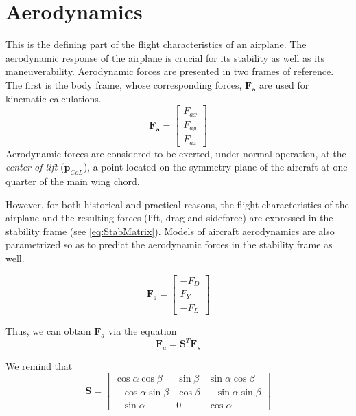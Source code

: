 \section{Aerodynamics}
This is the defining part of the flight characteristics of an airplane. The aerodynamic response of the airplane is crucial for its stability as well as its maneuverability.
Aerodynamic forces are presented in two frames of reference. The first is the body frame, whose corresponding forces, $\bm{F_a}$ are used for kinematic calculations. 
\begin{equation}
	\bm{F_a} = \begin{bmatrix}
	F_{ax} \\ F_{ay} \\ F_{az}
	\end{bmatrix}
\end{equation}
Aerodynamic forces are considered to be exerted, under normal operation, at the \emph{center of lift} ($\bm{p}_{CoL}$), a point located on the symmetry plane of the aircraft at one-quarter of the main wing chord.

However, for both historical and practical reasons, the flight characteristics of the airplane and the resulting forces (lift, drag and sideforce) are expressed in the stability frame (see \ref{eq:StabMatrix}). Models of aircraft aerodynamics are also parametrized so as to predict the aerodynamic forces in the stability frame as well.

\begin{equation}
	\bm{F_s} = \begin{bmatrix}
	-F_D \\ F_Y \\ -F_L
	\end{bmatrix}
\end{equation}

Thus, we can obtain $\bm{F}_a$ via the equation
\begin{equation}
	\bm{F}_a = \bm{S}^T \bm{F}_s
\end{equation}

We remind that
\begin{equation*}
	\bm{S} =
	\begin{bmatrix}
		\cos \alpha \cos \beta  & \sin \beta & \sin \alpha \cos \beta  \\
		-\cos \alpha \sin \beta & \cos \beta & -\sin \alpha \sin \beta \\
		-\sin \alpha            & 0          & \cos \alpha
	\end{bmatrix}
\end{equation*}

